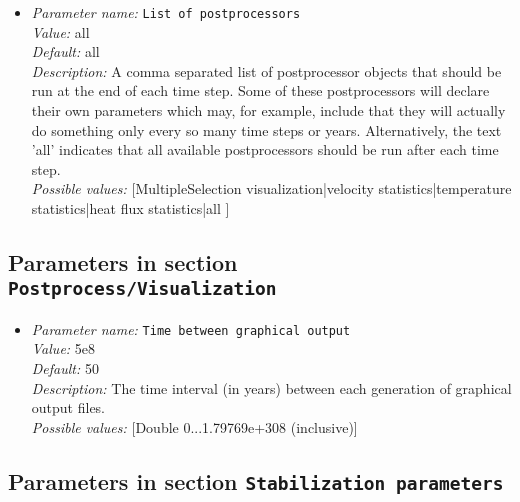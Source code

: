 \begin{itemize}
\item {\it Parameter name:} {\tt List of postprocessors}\\
{\it Value:} all\\
{\it Default:} all\\
{\it Description:} A comma separated list of postprocessor objects that should be run at the end of each time step. Some of these postprocessors will declare their own parameters which may, for example, include that they will actually do something only every so many time steps or years. Alternatively, the text 'all' indicates that all available postprocessors should be run after each time step.\\
{\it Possible values:} [MultipleSelection visualization|velocity statistics|temperature statistics|heat flux statistics|all ]
\end{itemize}



\subsection{Parameters in section \tt Postprocess/Visualization}

\begin{itemize}
\item {\it Parameter name:} {\tt Time between graphical output}\\
{\it Value:} 5e8\\
{\it Default:} 50\\
{\it Description:} The time interval (in years) between each generation of graphical output files.\\
{\it Possible values:} [Double 0...1.79769e+308 (inclusive)]
\end{itemize}

\subsection{Parameters in section \tt Stabilization parameters}

